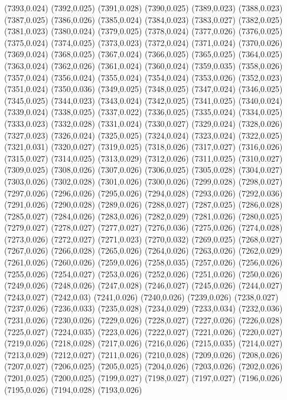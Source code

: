 (7393,0.024)
(7392,0.025)
(7391,0.028)
(7390,0.025)
(7389,0.023)
(7388,0.023)
(7387,0.025)
(7386,0.026)
(7385,0.024)
(7384,0.023)
(7383,0.027)
(7382,0.025)
(7381,0.023)
(7380,0.024)
(7379,0.025)
(7378,0.024)
(7377,0.026)
(7376,0.025)
(7375,0.024)
(7374,0.025)
(7373,0.023)
(7372,0.024)
(7371,0.024)
(7370,0.026)
(7369,0.024)
(7368,0.025)
(7367,0.024)
(7366,0.025)
(7365,0.025)
(7364,0.025)
(7363,0.024)
(7362,0.026)
(7361,0.024)
(7360,0.024)
(7359,0.035)
(7358,0.026)
(7357,0.024)
(7356,0.024)
(7355,0.024)
(7354,0.024)
(7353,0.026)
(7352,0.023)
(7351,0.024)
(7350,0.036)
(7349,0.025)
(7348,0.025)
(7347,0.024)
(7346,0.025)
(7345,0.025)
(7344,0.023)
(7343,0.024)
(7342,0.025)
(7341,0.025)
(7340,0.024)
(7339,0.024)
(7338,0.025)
(7337,0.022)
(7336,0.025)
(7335,0.024)
(7334,0.025)
(7333,0.023)
(7332,0.028)
(7331,0.024)
(7330,0.027)
(7329,0.024)
(7328,0.026)
(7327,0.023)
(7326,0.024)
(7325,0.025)
(7324,0.024)
(7323,0.024)
(7322,0.025)
(7321,0.031)
(7320,0.027)
(7319,0.025)
(7318,0.026)
(7317,0.027)
(7316,0.026)
(7315,0.027)
(7314,0.025)
(7313,0.029)
(7312,0.026)
(7311,0.025)
(7310,0.027)
(7309,0.025)
(7308,0.026)
(7307,0.026)
(7306,0.025)
(7305,0.028)
(7304,0.027)
(7303,0.026)
(7302,0.028)
(7301,0.026)
(7300,0.026)
(7299,0.028)
(7298,0.027)
(7297,0.026)
(7296,0.026)
(7295,0.026)
(7294,0.028)
(7293,0.026)
(7292,0.036)
(7291,0.026)
(7290,0.028)
(7289,0.026)
(7288,0.027)
(7287,0.025)
(7286,0.028)
(7285,0.027)
(7284,0.026)
(7283,0.026)
(7282,0.029)
(7281,0.026)
(7280,0.025)
(7279,0.027)
(7278,0.027)
(7277,0.027)
(7276,0.036)
(7275,0.026)
(7274,0.028)
(7273,0.026)
(7272,0.027)
(7271,0.023)
(7270,0.032)
(7269,0.025)
(7268,0.027)
(7267,0.026)
(7266,0.028)
(7265,0.026)
(7264,0.026)
(7263,0.026)
(7262,0.029)
(7261,0.026)
(7260,0.026)
(7259,0.026)
(7258,0.035)
(7257,0.026)
(7256,0.026)
(7255,0.026)
(7254,0.027)
(7253,0.026)
(7252,0.026)
(7251,0.026)
(7250,0.026)
(7249,0.026)
(7248,0.026)
(7247,0.028)
(7246,0.027)
(7245,0.026)
(7244,0.027)
(7243,0.027)
(7242,0.03)
(7241,0.026)
(7240,0.026)
(7239,0.026)
(7238,0.027)
(7237,0.026)
(7236,0.033)
(7235,0.028)
(7234,0.029)
(7233,0.034)
(7232,0.036)
(7231,0.026)
(7230,0.026)
(7229,0.026)
(7228,0.027)
(7227,0.026)
(7226,0.028)
(7225,0.027)
(7224,0.035)
(7223,0.026)
(7222,0.027)
(7221,0.026)
(7220,0.027)
(7219,0.026)
(7218,0.028)
(7217,0.026)
(7216,0.026)
(7215,0.035)
(7214,0.027)
(7213,0.029)
(7212,0.027)
(7211,0.026)
(7210,0.028)
(7209,0.026)
(7208,0.026)
(7207,0.027)
(7206,0.025)
(7205,0.025)
(7204,0.026)
(7203,0.026)
(7202,0.026)
(7201,0.025)
(7200,0.025)
(7199,0.027)
(7198,0.027)
(7197,0.027)
(7196,0.026)
(7195,0.026)
(7194,0.028)
(7193,0.026)
